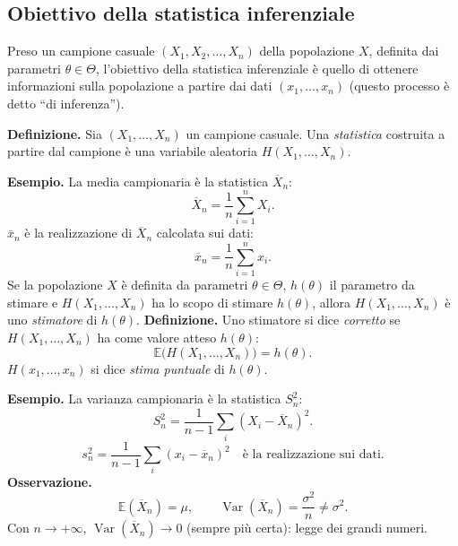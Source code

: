 \subsection*{Obiettivo della statistica inferenziale}
Preso un campione casuale $(X_1,X_2,\ldots,X_n)$ della popolazione $X$, definita dai parametri $\theta\in\Theta$, l'obiettivo della statistica inferenziale è quello di ottenere informazioni sulla popolazione a partire dai dati $(x_1,\ldots,x_n)$ (questo processo è detto ``di inferenza'').

\textbf{Definizione.} Sia $(X_1,\ldots,X_n)$ un campione casuale. Una \emph{statistica} costruita a partire dal campione è una variabile aleatoria $H(X_1,\ldots,X_n)$.

\textbf{Esempio.} La media campionaria è la statistica $\overline X_n$:
\[\boxed{\overline X_n=\frac1n\sum_{i=1}^n X_i}.\]
$\overline x_n$ è la realizzazione di $\overline X_n$ calcolata sui dati:
\[\overline x_n=\frac1n\sum_{i=1}^n x_i.\]
Se la popolazione $X$ è definita da parametri $\theta\in\Theta$, $h(\theta)$ il parametro da stimare e $H(X_1,\ldots,X_n)$ ha lo scopo di stimare $h(\theta)$, allora $H(X_1,\ldots,X_n)$ è uno \emph{stimatore} di $h(\theta)$.
\textbf{Definizione.} Uno stimatore si dice \emph{corretto} se $H(X_1,\ldots,X_n)$ ha come valore atteso $h(\theta)$:
\[\mathbb E\bigl(H(X_1,\ldots,X_n)\bigr)=h(\theta).\]
$H(x_1,\ldots,x_n)$ si dice \emph{stima puntuale} di $h(\theta)$.

\textbf{Esempio.} La varianza campionaria è la statistica $S_n^2$:
\[\boxed{S_n^2=\frac1{n-1}\sum_i(X_i-\overline X_n)^2}.\]
\[s_n^2=\frac1{n-1}\sum_i(x_i-\overline x_n)^2\quad\text{è la realizzazione sui dati}.\]
\textbf{Osservazione.}
\[\boxed{\mathbb E(\overline X_n)=\mu,\qquad\operatorname{Var}(\overline X_n)=\frac{\sigma^2}{n}\ne\sigma^2}.\]
Con $n\to+\infty$, $\operatorname{Var}(\overline X_n)\to0$ (sempre più certa): legge dei grandi numeri.
